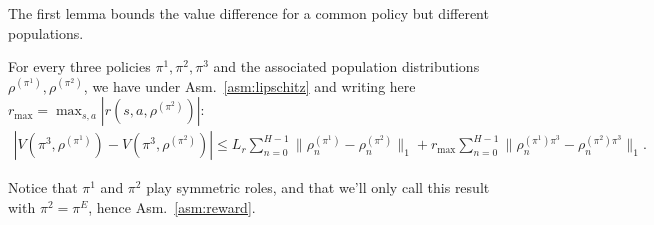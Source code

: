 \documentclass{article}
\begin{document}
The first lemma bounds the value  difference for a common policy but different populations.
\begin{lemma}
\label{lem:poli-pop}
For every three policies $\pi^1, \pi^2, \pi^3$ and the associated population distributions $\rho^{(\pi^1)}, \rho^{(\pi^2)}$, we have under Asm.~\ref{asm:lipschitz} and writing here $r_\text{max} = \max_{s,a}|r(s,a,\rho^{(\pi^2)})|$:
\begin{align}
    |V(\pi^3, \rho^{(\pi^1)}) - V(\pi^3, \rho^{(\pi^2)})| \le L_r\sum_{n=0}^{H-1}\|\rho^{(\pi^1)}_n - \rho^{(\pi^2)}_n\|_1 + r_{\max}\sum_{n=0}^{H-1} \|\rho^{(\pi^1)\pi^3}_n - \rho^{(\pi^2)\pi^3}_n\|_1.
\end{align}
\end{lemma}
\begin{remark}
    Notice that $\pi^1$ and $\pi^2$ play symmetric roles, and that we'll only call this result with $\pi^2 = \pi^E$, hence Asm.~\ref{asm:reward}.
\end{remark}
\end{document}
